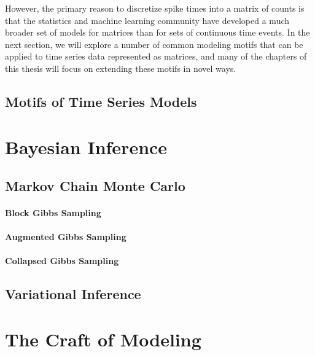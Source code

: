 However, the primary reason to discretize spike times into a matrix of
counts is that the statistics and machine learning community have
developed a much broader set of models for matrices than for sets of
continuous time events.  In the next section, we will explore a number
of common modeling motifs that can be applied to time series data
represented as matrices, and many of the chapters of this thesis will
focus on extending these motifs in novel ways.


\subsection{Motifs of Time Series Models}
\label{sec:motifs}







\section{Bayesian Inference}

\subsection{Markov Chain Monte Carlo}

\paragraph{Block Gibbs Sampling}

\paragraph{Augmented Gibbs Sampling}

\paragraph{Collapsed Gibbs Sampling}

\subsection{Variational Inference}


\section{The Craft of Modeling}
